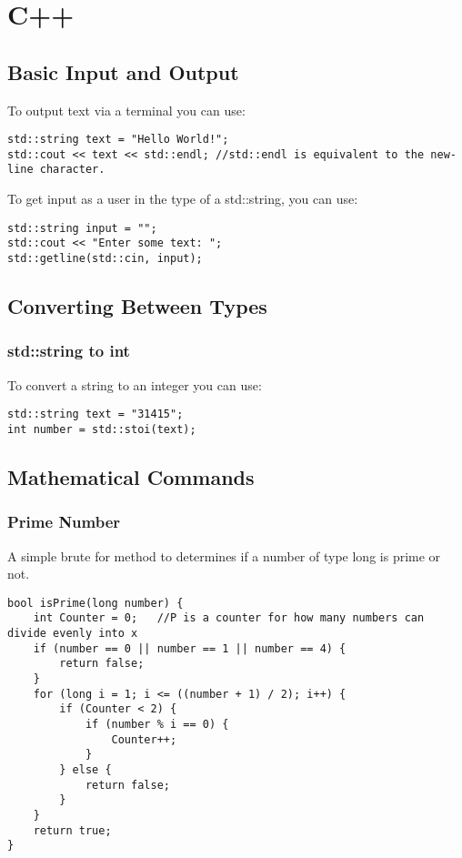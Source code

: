 \chapter{C++}
\thispagestyle{fancy}

\section{Basic Input and Output}
To output text via a terminal you can use:
\begin{lstlisting}
std::string text = "Hello World!";
std::cout << text << std::endl; //std::endl is equivalent to the new-line character.
\end{lstlisting}

To get input as a user in the type of a std::string, you can use:
\begin{lstlisting}
std::string input = "";
std::cout << "Enter some text: ";
std::getline(std::cin, input);
\end{lstlisting}

\section{Converting Between Types}

\subsection*{std::string to int}
To convert a string to an integer you can use:
\begin{lstlisting}
std::string text = "31415";
int number = std::stoi(text);
\end{lstlisting}

\section{Mathematical Commands}

\subsection*{Prime Number}
A simple brute for method to determines if a number of type long is prime or not.
\begin{lstlisting}
bool isPrime(long number) {  
	int Counter = 0;   //P is a counter for how many numbers can divide evenly into x
	if (number == 0 || number == 1 || number == 4) {
		return false;
	}
	for (long i = 1; i <= ((number + 1) / 2); i++) {
		if (Counter < 2) {
			if (number % i == 0) {
				Counter++;
			}
		} else {
			return false;
		}
	}
	return true;
}
\end{lstlisting}